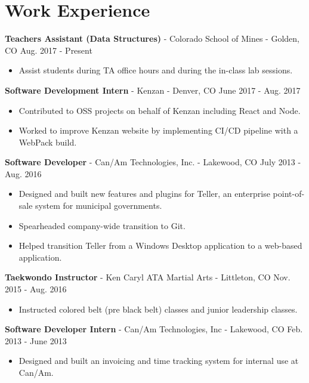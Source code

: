 \documentclass[10pt,letterpaper]{article}
\begin{document}
\section*{Work Experience}
\textbf{Teachers Assistant (Data Structures)} - Colorado School of Mines -
Golden, CO \hfill Aug. 2017 - Present
\begin{itemize}
    \item Assist students during TA office hours and during the in-class lab
        sessions.
\end{itemize}

\vspace{2pt}
\textbf{Software Development Intern} - Kenzan - Denver, CO
\hfill June 2017 - Aug. 2017
\begin{itemize}
    \item Contributed to OSS projects on behalf of Kenzan including React and
        Node.
    \item Worked to improve Kenzan website by implementing CI/CD pipeline with
        a WebPack build.
\end{itemize}

\vspace{2pt}
\textbf{Software Developer} - Can/Am Technologies, Inc. - Lakewood, CO
\hfill July 2013 - Aug. 2016
\begin{itemize}
    \item Designed and built new features and plugins for Teller, an enterprise
        point-of-sale system for municipal governments.
    \item Spearheaded company-wide transition to Git.
    \item Helped transition Teller from a Windows Desktop application to a
        web-based application.
\end{itemize}

\vspace{2pt}
\textbf{Taekwondo Instructor} - Ken Caryl ATA Martial Arts - Littleton, CO
\hfill Nov. 2015 - Aug. 2016
\begin{itemize}
    \item Instructed colored belt (pre black belt) classes and junior leadership
        classes.
\end{itemize}

\vspace{2pt}
\textbf{Software Developer Intern} - Can/Am Technologies, Inc - Lakewood, CO
\hfill Feb. 2013 - June 2013
\begin{itemize}
    \item Designed and built an invoicing and time tracking system for internal
        use at Can/Am.
\end{itemize}
\end{document}
